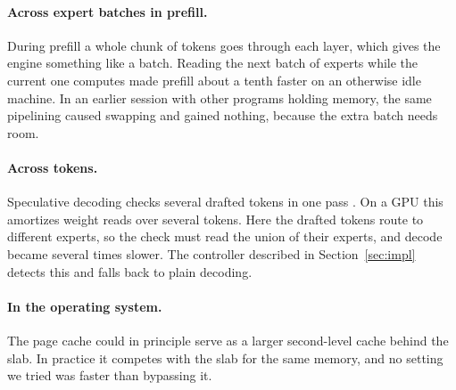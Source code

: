 \paragraph{Across expert batches in prefill.} During prefill a whole chunk of tokens goes through each layer, which gives the engine something like a batch. Reading the next batch of experts while the current one computes made prefill about a tenth faster on an otherwise idle machine. In an earlier session with other programs holding memory, the same pipelining caused swapping and gained nothing, because the extra batch needs room.

\paragraph{Across tokens.} Speculative decoding checks several drafted tokens in one pass \citep{specdecoding}. On a GPU this amortizes weight reads over several tokens. Here the drafted tokens route to different experts, so the check must read the union of their experts, and decode became several times slower. The controller described in Section~\ref{sec:impl} detects this and falls back to plain decoding.

\paragraph{In the operating system.} The page cache could in principle serve as a larger second-level cache behind the slab. In practice it competes with the slab for the same memory, and no setting we tried was faster than bypassing it.

\begin{table}[t]
\centering
\small
\caption{Other techniques, each measured against a baseline from the same session in tokens per second, or in seconds for prefill.}
\label{tab:negative}
\end{table}

